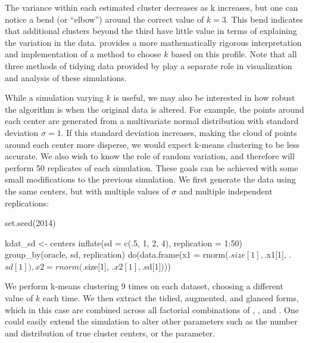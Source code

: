 The variance within each estimated cluster decreases as k increases, but one can notice a bend (or “elbow”) around the correct value of $k=3$. This bend indicates that additional clusters beyond the third have little value in terms of explaining the variation in the data. \citet{Tibshirani:2002fj} provides a more mathematically rigorous interpretation and implementation of a method to choose $k$ based on this profile. Note that all three methods of tidying data provided by  play a separate role in visualization and analysis of these simulations.

While a simulation varying $k$ is useful, we may also be interested in how robust the algorithm is when the original data is altered. For example, the points around each center are generated from a multivariate normal distribution with standard deviation $\sigma=1$. If this standard deviation increases, making the cloud of points around each center more disperse, we would expect k-means clustering to be less accurate. We also wish to know the role of random variation, and therefore will perform 50 replicates of each simulation. These goals can be achieved with some small modifications to the previous simulation. We first generate the data using the same centers, but with multiple values of $\sigma$ and multiple independent replications:


\begin{example}
set.seed(2014)
\end{example}

\begin{example}
kdat_sd <- centers %
    inflate(sd = c(.5, 1, 2, 4), replication = 1:50) %
    group_by(oracle, sd, replication) %
    do(data.frame(x1 = rnorm(.$size[1], .$x1[1], .$sd[1]),
                  x2 = rnorm(.$size[1], .$x2[1], .$sd[1])))
\end{example}


We perform k-means clustering 9 times on each dataset, choosing a different value of $k$ each time. We then extract the tidied, augmented, and glanced forms, which in this case are combined across all factorial combinations of , , and . One could easily extend the simulation to alter other parameters such as the number and distribution of true cluster centers, or the  parameter.



